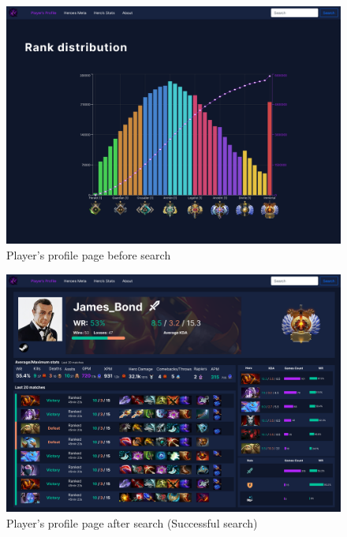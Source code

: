     \begin{figure}[ht]
        \centering
        \includegraphics[width=\textwidth]{images/PlayerProfileStartPage}
        \caption{Player's profile page before search}
        \label{fig:rankDistr}
    \end{figure}

    \begin{figure}[ht]
        \centering
        \includegraphics[width=\textwidth]{images/PlayerProfile}
        \caption{Player's profile page after search (Successful search)}
    \end{figure}

